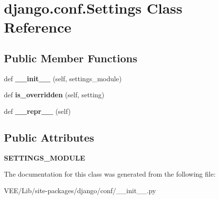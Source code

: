 \hypertarget{classdjango_1_1conf_1_1_settings}{}\section{django.\+conf.\+Settings Class Reference}
\label{classdjango_1_1conf_1_1_settings}
\subsection*{Public Member Functions}
\begin{DoxyCompactItemize}
\item 
\mbox{\label{classdjango_1_1conf_1_1_settings_acf54d18e45b9243d88846715717b306c}} 
def {\bfseries \+\_\+\+\_\+init\+\_\+\+\_\+} (self, settings\+\_\+module)
\item 
\mbox{\label{classdjango_1_1conf_1_1_settings_a18d5add3fe3c252f0d8b13aa58b8efbf}} 
def {\bfseries is\+\_\+overridden} (self, setting)
\item 
\mbox{\label{classdjango_1_1conf_1_1_settings_a6b72364069856243397a16507e063434}} 
def {\bfseries \+\_\+\+\_\+repr\+\_\+\+\_\+} (self)
\end{DoxyCompactItemize}
\subsection*{Public Attributes}
\begin{DoxyCompactItemize}
\item 
\mbox{\label{classdjango_1_1conf_1_1_settings_ac6506429d10c3fe8bba172a6e5a3157d}} 
{\bfseries S\+E\+T\+T\+I\+N\+G\+S\+\_\+\+M\+O\+D\+U\+LE}
\end{DoxyCompactItemize}


The documentation for this class was generated from the following file\+:\begin{DoxyCompactItemize}
\item 
V\+E\+E/\+Lib/site-\/packages/django/conf/\+\_\+\+\_\+init\+\_\+\+\_\+.\+py\end{DoxyCompactItemize}
